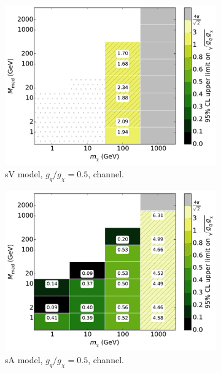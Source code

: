 \begin{figure}
\begin{subfigure}[t]{0.32\textwidth}
    \centering
    \includegraphics[width=1.\textwidth]{figures/grid_basepoints_SVD_rat2_monoWZ.pdf}
    \caption{sV model, $g_q/g_{\chi} = 0.5$, \monoWZ channel.}
    \vspace{0.75cm}
  \end{subfigure}
  \begin{subfigure}[t]{0.32\textwidth}
    \centering
    \includegraphics[width=1.\textwidth]{figures/grid_basepoints_SVD_rat2_monojet.pdf} %
    \caption{sA model, $g_q/g_{\chi} = 0.5$, \monojet channel.}
  \end{subfigure}
  \begin{subfigure}[t]{0.32\textwidth}
    \centering

\end{subfigure}
\end{figure}
